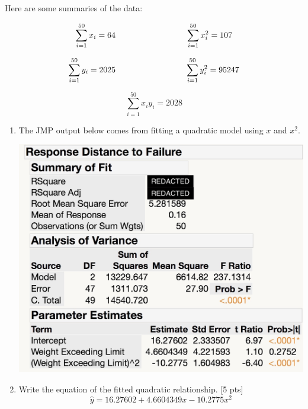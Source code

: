 \documentclass[11pt]{article}\usepackage[]{graphicx}\usepackage[]{color}
\begin{document}
\begin{enumerate}

\begin{center}
\end{center}


Here are some summaries of the data:

$$
\sum_{i=1}^{50} x_i = 64 \hspace{3cm} \sum_{i=1}^{50} x_i^2 = 107 \\
$$

$$
\sum_{i=1}^{50} y_i = 2025 \hspace{3cm} \sum_{i=1}^{50} y_i^2 = 95247 \\
$$

$$
\sum_{i=1}^{50} x_i y_i = 2028
$$

\begin{enumerate}


% 
   \item[]The JMP output below comes from fitting a quadratic model using $x$ and $x^2$.  
 
    \centerline{\includegraphics[scale=.2]{FitModel}}
 
 
       \item Write the equation of the fitted quadratic relationship. [5 pts]
      $$
      \hat{y} = 16.27602 + 4.6604349 x - 10.2775 x^2
      $$
      

\end{enumerate}
\end{enumerate}
\end{document}
